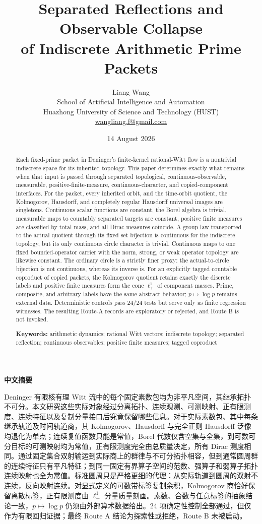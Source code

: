 \documentclass[11pt]{article}
\title{\textbf{Separated Reflections and Observable Collapse\\of Indiscrete Arithmetic Prime Packets}}
\author{Liang Wang\\
\small School of Artificial Intelligence and Automation\\
\small Huazhong University of Science and Technology (HUST)\\
\small \href{mailto:wangliang.f@gmail.com}{wangliang.f@gmail.com}}
\date{14 August 2026}
\theoremstyle{definition}
\begin{document}
\maketitle

\begin{abstract}
Each fixed-prime packet in Deninger's finite-kernel rational-Witt flow is a nontrivial indiscrete space for its inherited topology.  This paper determines exactly what remains when that input is passed through separated topological, continuous-observable, measurable, positive-finite-measure, continuous-character, and copied-component interfaces.  For the packet, every inherited orbit, and the time-orbit quotient, the Kolmogorov, Hausdorff, and completely regular Hausdorff universal images are singletons.  Continuous scalar functions are constant, the Borel algebra is trivial, measurable maps to countably separated targets are constant, positive finite measures are classified by total mass, and all Dirac measures coincide.  A group law transported to the actual quotient through its fixed set bijection is continuous for the indiscrete topology, but its only continuous circle character is trivial.  Continuous maps to one fixed bounded-operator carrier with the norm, strong, or weak operator topology are likewise constant.  The ordinary circle is a strictly finer proxy: the actual-to-circle bijection is not continuous, whereas its inverse is.  For an explicitly tagged countable coproduct of copied packets, the Kolmogorov quotient retains exactly the discrete labels and positive finite measures form the cone $\ell^1_+$ of component masses.  Prime, composite, and arbitrary labels have the same abstract behavior; $p\mapsto\log p$ remains external data.  Deterministic controls pass 24/24 tests but serve only as finite regression witnesses.  The resulting Route-A records are exploratory or rejected, and Route B is not invoked.

\medskip
\noindent\textbf{Keywords:} arithmetic dynamics; rational Witt vectors; indiscrete topology; separated reflection; continuous observables; positive finite measures; tagged coproduct
\end{abstract}

\begin{center}
\textbf{中文摘要}
\end{center}
Deninger 有限核有理 Witt 流中的每个固定素数包均为非平凡空间，其继承拓扑不可分。本文研究这些实际对象经过分离拓扑、连续观测、可测映射、正有限测度、连续特征以及复制分量接口后究竟保留哪些信息。对于实际素数包、其中每条继承轨道及时间轨道商，其 Kolmogorov、Hausdorff 与完全正则 Hausdorff 泛像均退化为单点；连续复值函数只能是常值，Borel 代数仅含空集与全集，到可数可分目标的可测映射均为常值，正有限测度完全由总质量决定，所有 Dirac 测度相同。通过固定集合双射输运到实际商上的群律与不可分拓扑相容，但到通常圆周群的连续特征只有平凡特征；到同一固定有界算子空间的范数、强算子和弱算子拓扑连续映射也全为常值。标准圆周只是严格更细的代理：从实际轨道到圆周的双射不连续，反向映射连续。对显式定义的可数带标签复制余积，Kolmogorov 商恰好保留离散标签，正有限测度由 $\ell^1_+$ 分量质量刻画。素数、合数与任意标签的抽象结论一致，$p\mapsto\log p$ 仍须由外部算术数据给出。24 项确定性控制全部通过，但仅作为有限回归证据；最终 Route A 结论为探索性或拒绝，Route B 未被启动。
\end{document}
